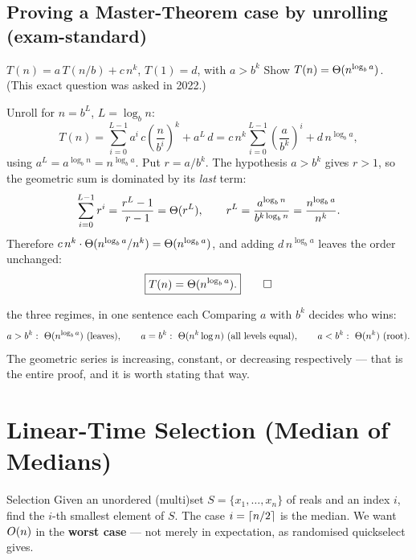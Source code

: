 \subsection*{Proving a Master-Theorem case by unrolling (exam-standard)}

\begin{prob}{$T(n)=a\,T(n/b)+c\,n^k$, $T(1)=d$, with $a>b^k$}
Show $T(n)=\Theta(n^{\log_b a})$. (This exact question was asked in 2022.)
\end{prob}

\prf Unroll for $n=b^L$, $L=\log_b n$:
\[
  T(n)=\sum_{i=0}^{L-1}a^i\,c\left(\frac{n}{b^i}\right)^{\!k}+a^L\,d
      =c\,n^k\sum_{i=0}^{L-1}\left(\frac{a}{b^k}\right)^{\!i}+d\,n^{\log_b a},
\]
using $a^L=a^{\log_b n}=n^{\log_b a}$. Put $r=a/b^k$. The hypothesis $a>b^k$ gives $r>1$, so the
geometric sum is dominated by its \emph{last} term:
\[
  \sum_{i=0}^{L-1}r^i=\frac{r^L-1}{r-1}=\Theta(r^L),
  \qquad
  r^L=\frac{a^{\log_b n}}{b^{k\log_b n}}=\frac{n^{\log_b a}}{n^k}.
\]
Therefore $c\,n^k\cdot\Theta(n^{\log_b a}/n^k)=\Theta(n^{\log_b a})$, and adding $d\,n^{\log_b a}$
leaves the order unchanged:
\[
  \boxed{T(n)=\Theta(n^{\log_b a}).} \qquad\square
\]

\begin{facts}{the three regimes, in one sentence each}
Comparing $a$ with $b^k$ decides who wins:
\[
  a>b^k:\ \Theta(n^{\log_b a})\ \text{(leaves)},\qquad
  a=b^k:\ \Theta(n^k\log n)\ \text{(all levels equal)},\qquad
  a<b^k:\ \Theta(n^k)\ \text{(root)}.
\]
The geometric series is increasing, constant, or decreasing respectively --- that is the entire
proof, and it is worth stating that way.
\end{facts}

\section{Linear-Time Selection (Median of Medians)}

\begin{prob}{Selection}
Given an unordered (multi)set $S=\{x_1,\dots,x_n\}$ of reals and an index $i$, find the $i$-th
smallest element of $S$. The case $i=\left\lceil n/2 \right\rceil$ is the median. We want $O(n)$ in the
\textbf{worst case} --- not merely in expectation, as randomised quickselect gives.
\end{prob}

